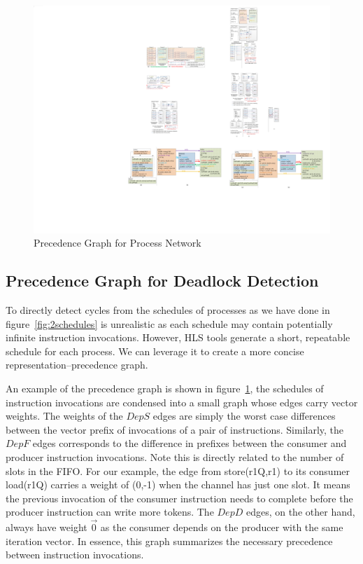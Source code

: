 \documentclass{sig-alternate}
\begin{document}
\begin{figure}[htp]
\begin{center}
\includegraphics[width=0.8\linewidth]{fig/predGraphNew.pdf}
\caption{Precedence Graph for Process Network
\label{fig:predgraph}}
\end{center}
\vspace{-2.5em}
\end{figure}



\subsection{Precedence Graph for Deadlock Detection}
To directly detect cycles from the schedules of processes as we have done in 
figure~\ref{fig:2schedules} is unrealistic as each schedule may contain potentially infinite instruction invocations.
However, HLS tools generate a short, repeatable schedule for each process.
We can leverage it to create a more concise representation--precedence graph.


An example of the precedence graph is shown in figure~\ref{fig:predgraph}, the schedules of instruction invocations are condensed into a small graph whose edges carry vector weights. 
The weights of the $DepS$ edges are simply the worst case differences between the vector prefix of invocations of a pair of instructions. 
Similarly, the $DepF$ edges corresponds to the difference in prefixes between
the consumer and producer instruction invocations. Note this is directly related
to the number of slots in the FIFO. For our example, the edge from store(r1Q,r1) to its consumer load(r1Q) carries a weight of (0,-1) when the channel has just one slot.
It means the previous invocation of the consumer instruction needs to complete before the producer instruction can write more tokens. The $DepD$ edges, on the other hand, always have weight $\vec{0}$ as the consumer depends on the producer with the same iteration vector. In essence, this graph
summarizes the necessary precedence between instruction invocations. 
\end{document}
